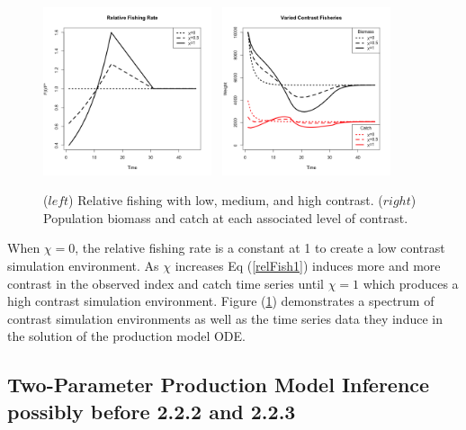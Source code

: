 %
\begin{figure}[h!]
\centering
\includegraphics[width=0.44\textwidth]{../ptNew/relFish.png}
$~$
\includegraphics[width=0.44\textwidth]{../ptNew/relSeries.png}
\caption{ \label{catchT45}
($left$) Relative fishing with low, medium, and high contrast.
($right$) Population biomass and catch at each associated level of contrast. %
}
\label{catch45}
\end{figure}
%
When $\chi=0$, the relative fishing rate is a constant at 1 to create a low
contrast simulation environment. As $\chi$ increases Eq (\ref{relFish1})
induces more and more contrast in the observed index and catch time series
until $\chi=1$ which produces a high contrast simulation environment.
Figure (\ref{catch45}) demonstrates a spectrum of contrast simulation
environments as well as the time series data they induce in the solution of
the production model ODE.

\subsection{Two-Parameter Production Model Inference\label{modelFit} {\color{red}possibly before 2.2.2 and 2.2.3} }

